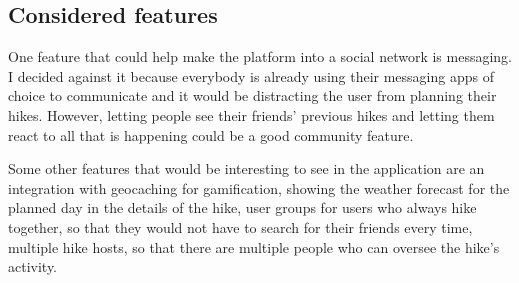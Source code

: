 
\subsection*{Considered features}
One feature that could help make the platform into a social network is messaging.
I decided against it because everybody is already using their messaging apps of choice to communicate and it would be distracting the user from planning their hikes.
However, letting people see their friends' previous hikes and letting them react to all that is happening could be a good community feature.

Some other features that would be interesting to see in the application are an integration with geocaching\cite{geocaching} for gamification,
showing the weather forecast for the planned day in the details of the hike,
user groups for users who always hike together, so that they would not have to search for their friends every time,
multiple hike hosts, so that there are multiple people who can oversee the hike's activity.
